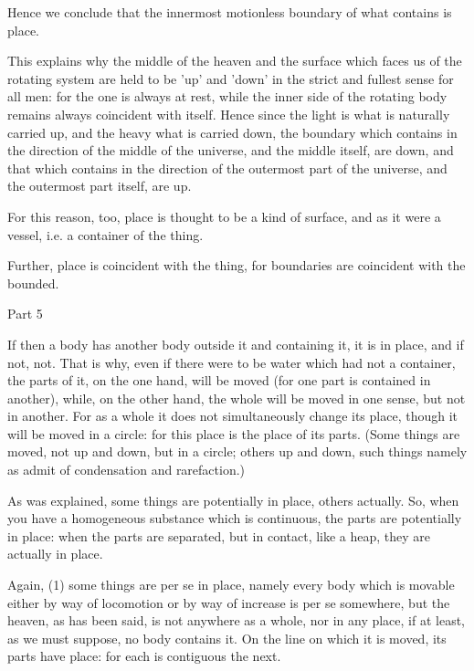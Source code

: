 Hence we conclude that the innermost motionless boundary of what contains
is place. 

This explains why the middle of the heaven and the surface which faces
us of the rotating system are held to be 'up' and 'down' in the strict
and fullest sense for all men: for the one is always at rest, while
the inner side of the rotating body remains always coincident with
itself. Hence since the light is what is naturally carried up, and
the heavy what is carried down, the boundary which contains in the
direction of the middle of the universe, and the middle itself, are
down, and that which contains in the direction of the outermost part
of the universe, and the outermost part itself, are up. 

For this reason, too, place is thought to be a kind of surface, and
as it were a vessel, i.e. a container of the thing. 

Further, place is coincident with the thing, for boundaries are coincident
with the bounded. 

Part 5

If then a body has another body outside it and containing it, it is
in place, and if not, not. That is why, even if there were to be water
which had not a container, the parts of it, on the one hand, will
be moved (for one part is contained in another), while, on the other
hand, the whole will be moved in one sense, but not in another. For
as a whole it does not simultaneously change its place, though it
will be moved in a circle: for this place is the place of its parts.
(Some things are moved, not up and down, but in a circle; others up
and down, such things namely as admit of condensation and rarefaction.)

As was explained, some things are potentially in place, others actually.
So, when you have a homogeneous substance which is continuous, the
parts are potentially in place: when the parts are separated, but
in contact, like a heap, they are actually in place. 

Again, (1) some things are per se in place, namely every body which
is movable either by way of locomotion or by way of increase is per
se somewhere, but the heaven, as has been said, is not anywhere as
a whole, nor in any place, if at least, as we must suppose, no body
contains it. On the line on which it is moved, its parts have place:
for each is contiguous the next. 

